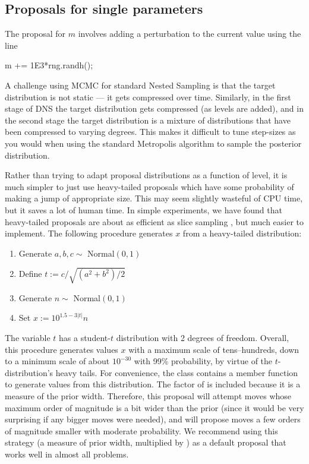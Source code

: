 \documentclass[article]{jss}
\begin{document}
\subsection{Proposals for single parameters}
The proposal for $m$ involves adding a perturbation to the current
value using the line

\begin{CodeChunk}
\begin{CodeInput}
m += 1E3*rng.randh();
\end{CodeInput}
\end{CodeChunk}

A challenge using MCMC for standard Nested Sampling is that the target
distribution is not static --- it gets compressed over time. Similarly, in
the first stage of DNS the target distribution gets compressed (as levels are
added), and in the second stage the target distribution is a mixture of
distributions that have been compressed to varying degrees.
This makes it difficult to tune step-sizes as you would when using
the standard Metropolis algorithm to sample the posterior distribution.

Rather than trying to adapt proposal distributions as a function of level,
it is much simpler to just use heavy-tailed proposals which have some
probability of making a jump of appropriate size. This may seem slightly
wasteful of CPU time, but it saves a lot of human time.
In simple experiments, we have found that heavy-tailed proposals are
about as efficient as slice sampling \citep{slice}, but much easier to
implement. The following procedure generates
$x$ from a heavy-tailed distribution:

\begin{enumerate}
\item Generate $a, b, c \sim$ Normal$(0, 1)$
\item Define $t := c/\sqrt{(a^2 + b^2)/2}$
\item Generate $n \sim$ Normal$(0, 1)$
\item Set $x := 10^{1.5 - 3|t|}n$
\end{enumerate}
The variable $t$ has a student-$t$ distribution with 2 degrees of freedom.
Overall, this procedure generates values $x$
with a maximum scale of tens--hundreds, down to
a minimum scale of about $10^{-30}$ with 99\% probability, by virtue
of the $t$-distribution's heavy tails.
For convenience, the  class contains a member function 
to generate values from this distribution.
The factor of  is included because it is a measure of the prior
width. Therefore, this proposal will attempt moves whose maximum order of
magnitude is a bit wider than the prior (since it would be very surprising
if any bigger moves were needed), and will propose moves a few orders of
magnitude smaller with moderate probability. We recommend using
this strategy (a measure of prior width, multiplied by ) as
a default proposal that works well in almost all problems.
\end{document}
